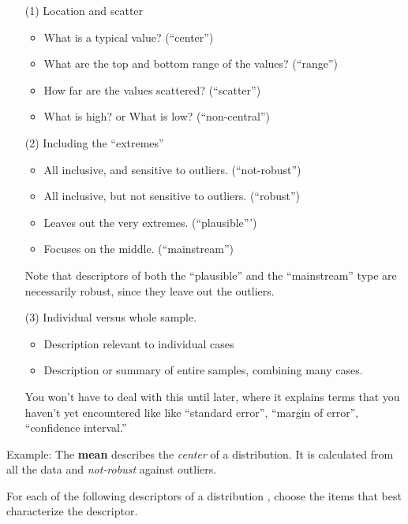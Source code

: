 \begin{itemize}
\item[(1)] Location and scatter
\begin{itemize}
\item What is a typical value? (``center'')
\item What are the top and bottom range of the values? (``range'')
\item How far are the values scattered? (``scatter'')
\item What is high? or What is low? (``non-central'')
\end{itemize}

\item[(2)] Including the ``extremes''
\begin{itemize}
\item All inclusive, and sensitive to outliers. (``not-robust'')
\item All inclusive, but not sensitive to outliers. (``robust'')
\item Leaves out the very extremes. (``plausible''')
\item Focuses on the middle. (``mainstream'')
\end{itemize}
Note that descriptors of both the ``plausible'' and the ``mainstream''
type are necessarily robust, since they leave out the outliers.

\item[(3)] Individual versus whole sample.
\begin{itemize}
\item Description relevant to individual cases
\item Description or summary of entire samples, combining many cases.
\end{itemize}
You won't have to deal with this until later, where it explains terms
that you haven't yet encountered like like ``standard error'',
``margin of error'', ``confidence interval.''

\end{itemize}

\medskip

\noindent Example: The {\bf mean} describes the {\em center} of a
distribution.  It is calculated from all the data and {\em not-robust}
against outliers.

\bigskip

For each of the following descriptors of a distribution , choose the
items that best characterize the descriptor.

